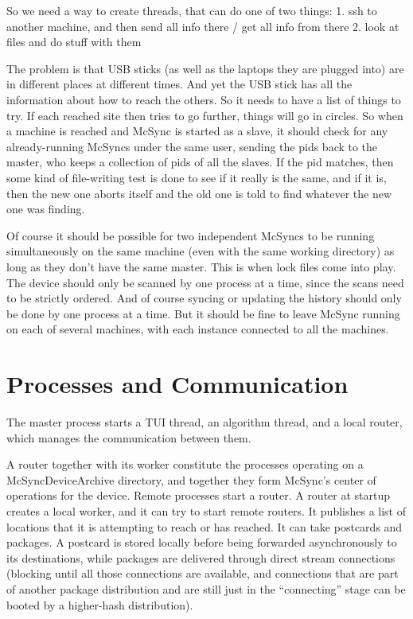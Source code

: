 \documentclass{book}
\begin{document}
So we need a way to create threads, that can do one of two things:
1. ssh to another machine, and then send all info there / get all info from there
2. look at files and do stuff with them

The problem is that USB sticks (as well as the laptops they are plugged into) are in different places at different times.  And yet the USB stick has all the information about how to reach the others.  So it needs to have a list of things to try.  If each reached site then tries to go further, things will go in circles.  So when a machine is reached and McSync is started as a slave, it should check for any already-running McSyncs under the same user, sending the pids back to the master, who keeps a collection of pids of all the slaves.  If the pid matches, then some kind of file-writing test is done to see if it really is the same, and if it is, then the new one aborts itself and the old one is told to find whatever the new one was finding.

Of course it should be possible for two independent McSyncs to be running simultaneously on the same machine (even with the same working directory) as long as they don't have the same master.  This is when lock files come into play.  The device should only be scanned by one process at a time, since the scans need to be strictly ordered.  And of course syncing or updating the history should only be done by one process at a time.  But it should be fine to leave McSync running on each of several machines, with each instance connected to all the machines.





\section{Processes and Communication}

The master process starts a TUI thread, an algorithm thread, and a local router, which manages the communication between them.

A router together with its worker constitute the processes operating on a McSyncDeviceArchive directory, and together they form McSync's center of operations for the device.  Remote processes start a router.  A router at startup creates a local worker, and it can try to start remote routers.  It publishes a list of locations that it is attempting to reach or has reached.  It can take postcards and packages.  A postcard is stored locally before being forwarded asynchronously to its destinations, while packages are delivered through direct stream connections (blocking until all those connections are available, and connections that are part of another package distribution and are still just in the ``connecting'' stage can be booted by a higher-hash distribution).
\end{document}
